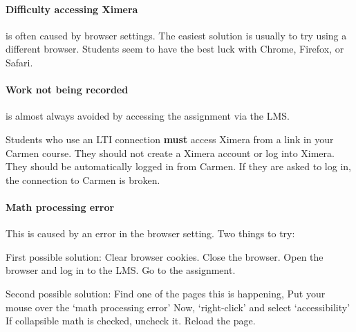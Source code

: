 \documentclass{ximera}
\begin{document}
\paragraph{Difficulty accessing Ximera} is often caused by browser settings. The
easiest solution is usually to try using a different browser. Students seem to
have the best luck with Chrome, Firefox, or Safari.


\paragraph{Work not being recorded} is almost always avoided by accessing the assignment via the LMS.

\begin{warning}
    Students who use an LTI connection \textbf{must} access Ximera from a link in your Carmen course.
They should not create a Ximera account or log into Ximera. They should be
automatically logged in from Carmen. If they are asked to log in, the connection
to Carmen is broken.
\end{warning}



\paragraph{Math processing error}

This is caused by an error in the browser setting. Two things to try:

First possible solution: Clear browser cookies. Close the browser.
Open the browser and log in to the LMS. Go to the assignment.



Second possible solution:
Find one of the pages this is happening,
Put your mouse over the `math processing error'
Now, `right-click' and select `accessibility' If collapsible math is
checked, uncheck it. Reload the page.



\end{document}

